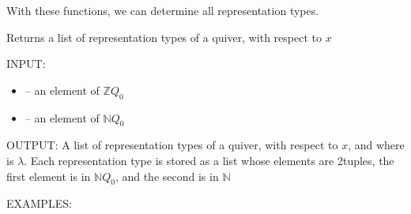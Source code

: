\documentclass[letterpaper,10pt,english]{sphinxmanual}
\begin{document}
\sphinxAtStartPar
With these functions, we can determine all representation types.

\begin{fulllineitems}
\label{\detokenize{index:quivercombinatorics.quivercombinatorics.Quiver.all_representation_types}}
\pysigstartsignatures
\pysiglinewithargsret
{}
{\sphinxparamcomma {}}
{}
\pysigstopsignatures
\sphinxAtStartPar
Returns a list of representation types of a quiver, with respect to \(x\)

\sphinxAtStartPar
INPUT:
\begin{itemize}
\item {} 
\sphinxAtStartPar
{} – an element of \(\mathbb{Z}Q_0\)

\item {} 
\sphinxAtStartPar
{} – an element of \(\mathbb{N}Q_0\)

\end{itemize}

\sphinxAtStartPar
OUTPUT: A list of representation types of a quiver, with respect to \(x\), and where  is \(\lambda\). Each representation type is stored as a list whose elements are 2\sphinxhyphen{}tuples, the first element is in \(\mathbb{N}Q_0\), and the second is in \(\mathbb{N}\)

\sphinxAtStartPar
EXAMPLES:


\end{fulllineitems}
\end{document}
